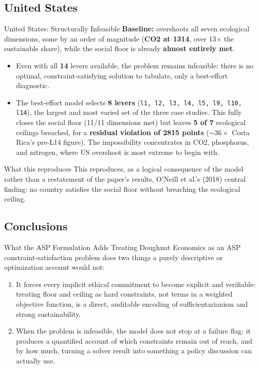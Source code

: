 \documentclass[11pt,aspectratio=169]{beamer}
\begin{document}
\subsection{United States}
\begin{frame}{United States: Structurally Infeasible}
  \footnotesize
  \textbf{Baseline:} overshoots \alert{all seven} ecological dimensions, some by an order of magnitude (\textbf{CO2 at 1314}, over 13$\times$ the sustainable share), while the social floor is already \textbf{almost entirely met}.
  \begin{itemize}
    \item Even with all \textbf{14} levers available, the problem remains \alert{infeasible}: there is no optimal, constraint-satisfying solution to tabulate, only a best-effort diagnostic.
    \item The best-effort model selects \textbf{8 levers} (\texttt{l1, l2, l3, l4, l5, l9, l10, l14}), the largest and most varied set of the three case studies. This fully closes the social floor (11/11 dimensions met) but leaves \textbf{5 of 7} ecological ceilings breached, for a \textbf{residual violation of 2815 points} ($\sim 36\times$ Costa Rica's pre-L14 figure). The impossibility concentrates in CO2, phosphorus, and nitrogen, where US overshoot is most extreme to begin with.
  \end{itemize}
  \begin{alertblock}{What this reproduces}
    This reproduces, as a logical consequence of the model rather than a restatement of the paper's results, O'Neill et al.'s (2018) central finding: no country satisfies the social floor without breaching the ecological ceiling.
  \end{alertblock}
\end{frame}

\subsection{Conclusions}
\begin{frame}{What the ASP Formulation Adds}
  Treating Doughnut Economics as an ASP constraint-satisfaction problem does two things a purely descriptive or optimization account would not:
  \begin{enumerate}
    \item It forces every implicit ethical commitment to become \alert{explicit and verifiable}: treating floor and ceiling as hard constraints, not terms in a weighted objective function, is a direct, auditable encoding of sufficientarianism and strong sustainability.
    \item When the problem is infeasible, the model does not stop at a failure flag: it produces a \alert{quantified account} of which constraints remain out of reach, and by how much, turning a solver result into something a policy discussion can actually use.
  \end{enumerate}
\end{frame}
\end{document}
